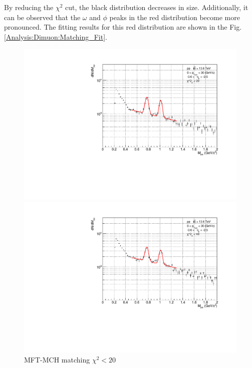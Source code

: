             By reducing the \(\chi^2\) cut, the black distribution decreases in size. Additionally, it can be observed that the \(\omega\) and \(\phi\) peaks in the red distribution become more pronounced. The fitting results for this red distribution are shown in the Fig.\ref{Analysis:Dimuon:Matching_Fit}.\@
            \begin{figure}[H]
                \centering
                \begin{minipage}{0.45\textwidth}
                    \centering
                    \includegraphics[width=\textwidth]{fig/3_4_4_Fit_chi2_20.pdf}
                    \caption*{MFT-MCH matching $\chi^2 < 20$}
                \end{minipage}
                \hfill
                \begin{minipage}{0.45\textwidth}
                    \centering
                    \includegraphics[width=\textwidth]{fig/3_4_4_Fit_chi2_40.pdf}

\end{minipage}
\end{figure}
